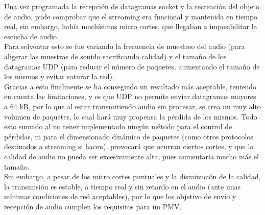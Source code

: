Una vez programada la recepción de datagramas socket y la recreación del objeto
de audio, pude comprobar que el streaming era funcional y mantenida en tiempo
real, sin embargo, había muchísimos micro cortes, que llegaban a imposibilitar
la escucha de audio.\\

Para solventar esto se fue variando la frecuencia de muestreo del audio (para
aligerar las muestras de sonido sacrificando calidad) y el tamaño de los
datagramas UDP (para reducir el número de paquetes, aumentando el tamaño de los
mismos y evitar saturar la red).\\

Gracias a esto finalmente se ha conseguido un resultado más aceptable, teniendo
en cuenta las limitaciones, y es que UDP no permite enviar datagramas mayores a
64 kB, por lo que al estar transmitiendo audio sin procesar, se crea un muy alto
volumen de paquetes, lo cual hará muy propensa la pérdida de los mismos. Todo
esto sumado al no tener implementado ningún método para el control de pérdidas,
ni para el dimensionado dinámico de paquetes (como otros protocolos destinados a
streaming si hacen), provocará que ocurran ciertos cortes, y que la calidad de
audio no pueda ser excesivamente alta, pues aumentaría mucho más el tamaño.\\

Sin embargo, a pesar de los micro cortes puntuales y la disminución de la
calidad, la transmisión es estable, a tiempo real y sin retardo en el audio
(ante unas mínimas condiciones de red aceptables), por lo que los objetivo de
envío y recepción de audio cumplen los requisitos para un PMV.

